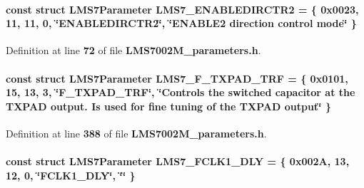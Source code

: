 \paragraph[{L\+M\+S7\+\_\+\+E\+N\+A\+B\+L\+E\+D\+I\+R\+C\+T\+R2}]{\setlength{\rightskip}{0pt plus 5cm}const struct {\bf L\+M\+S7\+Parameter} L\+M\+S7\+\_\+\+E\+N\+A\+B\+L\+E\+D\+I\+R\+C\+T\+R2 = \{ 0x0023, 11, 11, 0, \char`\"{}\+E\+N\+A\+B\+L\+E\+D\+I\+R\+C\+T\+R2\char`\"{}, \char`\"{}\+E\+N\+A\+B\+L\+E2 direction control mode\char`\"{} \}\hspace{0.3cm}{\ttfamily [static]}}\label{LMS7002M__parameters_8h_ab524c2802ed66d53e869e9072128bac0}


Definition at line {\bf 72} of file {\bf L\+M\+S7002\+M\+\_\+parameters.\+h}.

\paragraph[{L\+M\+S7\+\_\+\+F\+\_\+\+T\+X\+P\+A\+D\+\_\+\+T\+RF}]{\setlength{\rightskip}{0pt plus 5cm}const struct {\bf L\+M\+S7\+Parameter} L\+M\+S7\+\_\+\+F\+\_\+\+T\+X\+P\+A\+D\+\_\+\+T\+RF = \{ 0x0101, 15, 13, 3, \char`\"{}\+F\+\_\+\+T\+X\+P\+A\+D\+\_\+\+T\+R\+F\char`\"{}, \char`\"{}\+Controls the switched capacitor at the T\+X\+P\+A\+D output. Is used for fine tuning of the T\+X\+P\+A\+D output\char`\"{} \}\hspace{0.3cm}{\ttfamily [static]}}\label{LMS7002M__parameters_8h_aedf25b9a7d7f2fd246eb1b7601b990a3}


Definition at line {\bf 388} of file {\bf L\+M\+S7002\+M\+\_\+parameters.\+h}.

\paragraph[{L\+M\+S7\+\_\+\+F\+C\+L\+K1\+\_\+\+D\+LY}]{\setlength{\rightskip}{0pt plus 5cm}const struct {\bf L\+M\+S7\+Parameter} L\+M\+S7\+\_\+\+F\+C\+L\+K1\+\_\+\+D\+LY = \{ 0x002\+A, 13, 12, 0, \char`\"{}\+F\+C\+L\+K1\+\_\+\+D\+L\+Y\char`\"{}, \char`\"{}\char`\"{} \}\hspace{0.3cm}{\ttfamily [static]}}\label{LMS7002M__parameters_8h_a32583de779897523399d0900a9928262}


